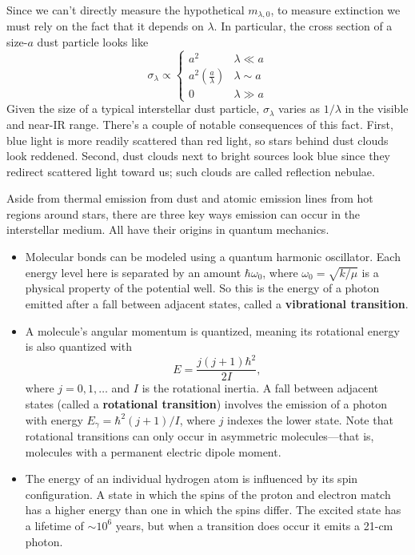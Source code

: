 \documentclass[../a062main.tex]{subfiles}
\begin{document}
Since we can't directly measure the hypothetical $m_{\lambda,0}$, to measure extinction we must rely on the fact that it depends on $\lambda$.
In particular, the cross section of a size-$a$ dust particle looks like
\[ \sigma_\lambda \propto \begin{cases} a^2 & \lambda \ll a \\ a^2 \left( \frac{a}{\lambda} \right) & \lambda \sim a \\ 0 & \lambda \gg a \end{cases} \]
Given the size of a typical interstellar dust particle, $\sigma_\lambda$ varies as $1 / \lambda$ in the visible and near-IR range.
There's a couple of notable consequences of this fact.
First, blue light is more readily scattered than red light, so stars behind dust clouds look reddened.
Second, dust clouds next to bright sources look blue since they redirect scattered light toward us; such clouds are called reflection nebulae.

Aside from thermal emission from dust and atomic emission lines from hot regions around stars, there are three key ways emission can occur in the interstellar medium.
All have their origins in quantum mechanics.
\begin{itemize}
    \item Molecular bonds can be modeled using a quantum harmonic oscillator.
    Each energy level here is separated by an amount $\hbar \omega_0$, where $\omega_0 = \sqrt{k / \mu}$ is a physical property of the potential well.
    So this is the energy of a photon emitted after a fall between adjacent states, called a \textbf{vibrational transition}.

    \item A molecule's angular momentum is quantized, meaning its rotational energy is also quantized with
    \[ E = \frac{j(j+1)\hbar^2}{2I}, \]
    where $j = 0,1,\ldots$ and $I$ is the rotational inertia.
    A fall between adjacent states (called a \textbf{rotational transition}) involves the emission of a photon with energy $E_\gamma = \hbar^2 (j+1) / I$, where $j$ indexes the lower state.
    Note that rotational transitions can only occur in asymmetric molecules---that is, molecules with a permanent electric dipole moment.

    \item The energy of an individual hydrogen atom is influenced by its spin configuration.
    A state in which the spins of the proton and electron match has a higher energy than one in which the spins differ.
    The excited state has a lifetime of $\sim 10^{6}$ years, but when a transition does occur it emits a 21-cm photon.
\end{itemize}
\end{document}
